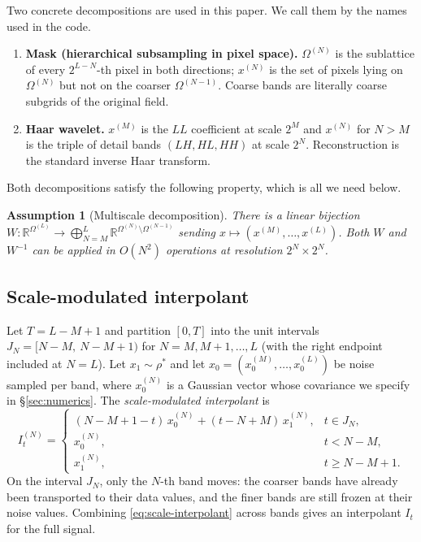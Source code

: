 \documentclass[11pt]{amsart}
\newcommand{\bR}{\mathbb{R}} \newcommand{\bN}{\mathbb{N}}
\newtheorem{assumption}[theorem]{Assumption}
\theoremstyle{remark}
\numberwithin{equation}{section}
\begin{document}
Two concrete decompositions are used in this paper. We call them by the names used in the code.
\begin{enumerate}
\item \textbf{Mask (hierarchical subsampling in pixel space).} $\Omega^{(N)}$ is the sublattice of every $2^{L-N}$-th pixel in both directions; $x^{(N)}$ is the set of pixels lying on $\Omega^{(N)}$ but not on the coarser $\Omega^{(N-1)}$. Coarse bands are literally coarse subgrids of the original field.
\item \textbf{Haar wavelet.} $x^{(M)}$ is the $LL$ coefficient at scale $2^M$ and $x^{(N)}$ for $N>M$ is the triple of detail bands $(LH,HL,HH)$ at scale $2^N$. Reconstruction is the standard inverse Haar transform.
\end{enumerate}
Both decompositions satisfy the following property, which is all we need below.
\begin{assumption}[Multiscale decomposition]
\label{ass:decomp}
There is a linear bijection $W:\bR^{\Omega^{(L)}}\to\bigoplus_{N=M}^L\bR^{\Omega^{(N)}\setminus\Omega^{(N-1)}}$ sending $x\mapsto(x^{(M)},\ldots,x^{(L)})$. Both $W$ and $W^{-1}$ can be applied in $O(N^2)$ operations at resolution $2^N\times 2^N$.
\end{assumption}

\subsection{Scale-modulated interpolant}
Let $T=L-M+1$ and partition $[0,T]$ into the unit intervals
$J_N=[N-M,\ N-M+1)$ for $N=M,M+1,\ldots,L$ (with the right endpoint included at $N=L$). Let $x_1\sim\rho^*$ and let $x_0=(x_0^{(M)},\ldots,x_0^{(L)})$ be noise sampled per band, where $x_0^{(N)}$ is a Gaussian vector whose covariance we specify in \S\ref{sec:numerics}. The \emph{scale-modulated interpolant} is
\begin{equation}
\label{eq:scale-interpolant}
 I_t^{(N)} = \begin{cases}
 (N-M+1-t)\,x_0^{(N)} + (t-N+M)\,x_1^{(N)}, & t\in J_N,\\
 x_0^{(N)}, & t<N-M,\\
 x_1^{(N)}, & t\ge N-M+1.
\end{cases}
\end{equation}
On the interval $J_N$, only the $N$-th band moves: the coarser bands have already been transported to their data values, and the finer bands are still frozen at their noise values. Combining \eqref{eq:scale-interpolant} across bands gives an interpolant $I_t$ for the full signal.
\end{document}
